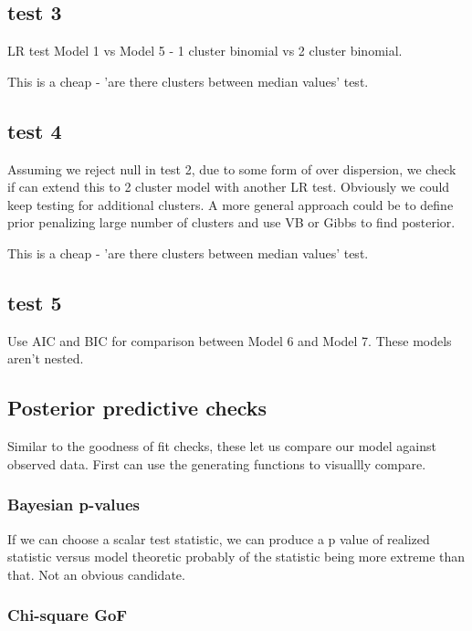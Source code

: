 \documentclass[11pt,a4,singlespacing,titlepagenumber=on]{scrreprt}
\numberwithin{equation}{chapter} %
\theoremstyle{remark}
\begin{document}
\subsection{test 3}

LR test Model 1 vs Model 5 - 1 cluster binomial vs 2 cluster binomial. 

This is a cheap - 'are there clusters between median values' test. 

\subsection{test 4}

Assuming we reject null in test 2, due to some form of over dispersion, we check if can extend this to 2 cluster model with another LR test. Obviously we could keep testing for additional clusters. A more general approach could be to define prior penalizing large number of clusters and use VB or Gibbs to find posterior.

This is a cheap - 'are there clusters between median values' test. 


\subsection{test 5}

Use AIC and BIC for comparison between Model 6 and Model 7. These models aren't nested.

\subsection{Posterior predictive checks}

Similar to the goodness of fit checks, these let us compare our model against observed data. First can use the generating functions to visuallly compare.

\subsubsection{Bayesian p-values}

If we can choose a scalar test statistic, we can produce a p value of realized statistic versus model theoretic probably of the statistic being more extreme than that. Not an obvious candidate.

\subsubsection{Chi-square GoF}
\end{document}

